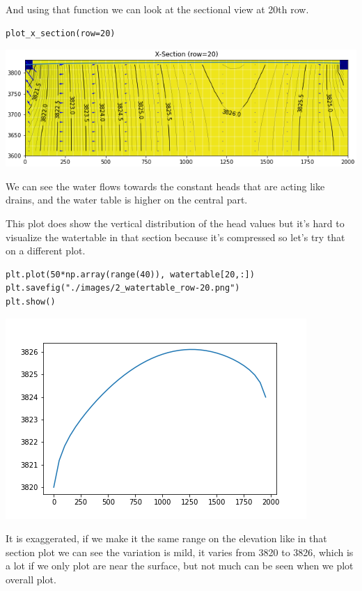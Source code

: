 \documentclass[titlepage,12pt]{unisubmission}
\begin{document}
And using that function we can look at the sectional view at 20th row.

\begin{verbatim}
plot_x_section(row=20)
\end{verbatim}

\begin{center}
\includegraphics[width=.9\linewidth]{./images/2_section_row-20.png}
\end{center}

We can see the water flows towards the constant heads that are acting like drains, and the water table is higher on the central part.

This plot does show the vertical distribution of the head values but it's hard to visualize the watertable in that section because it's compressed so let's try that on a different plot.

\begin{verbatim}
plt.plot(50*np.array(range(40)), watertable[20,:])
plt.savefig("./images/2_watertable_row-20.png")
plt.show()
\end{verbatim}

\begin{center}
\includegraphics[width=.9\linewidth]{./images/2_watertable_row-20.png}
\end{center}

It is exaggerated, if we make it the same range on the elevation like in that section plot we can see the variation is mild, it varies from 3820 to 3826, which is a lot if we only plot are near the surface, but not much can be seen when we plot overall plot. 
\end{document}
